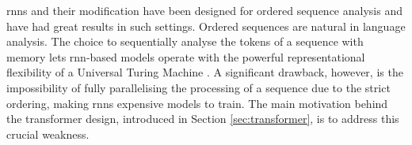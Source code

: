 %

\glspl{rnn} and their modification have been designed for ordered sequence analysis and have had great results in such settings. Ordered sequences are natural in language analysis. The choice to sequentially analyse the tokens of a sequence with memory lets \gls{rnn}-based models operate with the powerful representational flexibility of a Universal Turing Machine \cite{NEURIPS2021_ef452c63}. A significant drawback, however, is the impossibility of fully parallelising the processing of a sequence due to the strict ordering, making \glspl{rnn} expensive models to train. The main motivation behind the transformer design, introduced in Section \ref{sec:transformer}, is to address this crucial weakness.

